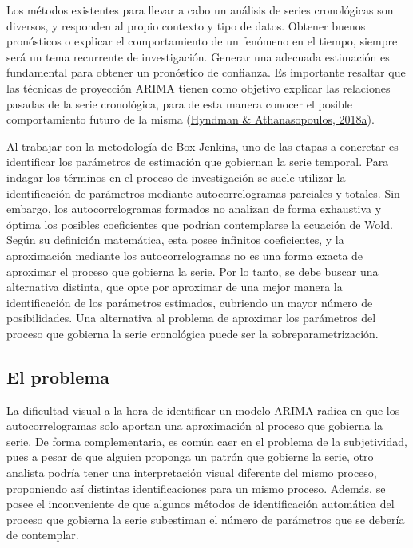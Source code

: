 \documentclass[
]{article}
\begin{document}
Los métodos existentes para llevar a cabo un análisis de series
cronológicas son diversos, y responden al propio contexto y tipo de
datos. Obtener buenos pronósticos o explicar el comportamiento de un
fenómeno en el tiempo, siempre será un tema recurrente de investigación.
Generar una adecuada estimación es fundamental para obtener un
pronóstico de confianza. Es importante resaltar que las técnicas de
proyección ARIMA tienen como objetivo explicar las relaciones pasadas de
la serie cronológica, para de esta manera conocer el posible
comportamiento futuro de la misma
(\protect\hyperlink{ref-hyndman2018forecasting}{Hyndman \&
Athanasopoulos, 2018a}).

Al trabajar con la metodología de Box-Jenkins, uno de las etapas a
concretar es identificar los parámetros de estimación que gobiernan la
serie temporal. Para indagar los términos en el proceso de investigación
se suele utilizar la identificación de parámetros mediante
autocorrelogramas parciales y totales. Sin embargo, los
autocorrelogramas formados no analizan de forma exhaustiva y óptima los
posibles coeficientes que podrían contemplarse la ecuación de Wold.
Según su definición matemática, esta posee infinitos coeficientes, y la
aproximación mediante los autocorrelogramas no es una forma exacta de
aproximar el proceso que gobierna la serie. Por lo tanto, se debe buscar
una alternativa distinta, que opte por aproximar de una mejor manera la
identificación de los parámetros estimados, cubriendo un mayor número de
posibilidades. Una alternativa al problema de aproximar los parámetros
del proceso que gobierna la serie cronológica puede ser la
sobreparametrización.

\subsection{El problema}

La dificultad visual a la hora de identificar un modelo ARIMA radica en
que los autocorrelogramas solo aportan una aproximación al proceso que
gobierna la serie. De forma complementaria, es común caer en el problema
de la subjetividad, pues a pesar de que alguien proponga un patrón que
gobierne la serie, otro analista podría tener una interpretación visual
diferente del mismo proceso, proponiendo así distintas identificaciones
para un mismo proceso. Además, se posee el inconveniente de que algunos
métodos de identificación automática del proceso que gobierna la serie
subestiman el número de parámetros que se debería de contemplar.
\end{document}
